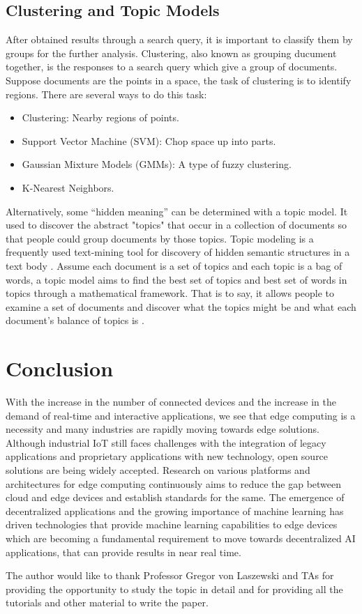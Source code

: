 \documentclass[sigconf]{acmart}
\begin{document}
\subsection{Clustering and Topic Models}
After obtained results through a search query, it is important to classify them by groups for the further analysis. Clustering, also known as grouping ducument together, is the responses to a search query which give a group of documents. Suppose documents are the points in a space, the task of clustering is to identify regions. There are several ways to do this task:
\begin{itemize}
\item Clustering: Nearby regions of points.
\item Support Vector Machine (SVM): Chop space up into parts.
\item Gaussian Mixture Models (GMMs): A type of fuzzy clustering.
\item K-Nearest Neighbors.
\end{itemize}

Alternatively, some “hidden meaning” can be determined with a topic model. It used to discover the abstract "topics" that occur in a collection of documents so that people could group documents by those topics. Topic modeling is a frequently used text-mining tool for discovery of hidden semantic structures in a text body \cite{editor11}. Assume each document is a set of topics and each topic is a bag of words, a topic model aims to find the best set of topics and best set of words in topics through a mathematical framework. That is to say, it allows people to examine a set of documents and discover what the topics might be and what each document's balance of topics is \cite{editor11}.

\section{Conclusion}
With the increase in the number of connected devices and the increase in the demand of real-time and interactive applications, we see that edge computing is a necessity and many industries are rapidly moving towards edge solutions. Although industrial IoT still faces challenges with the integration of legacy applications and proprietary applications with new technology, open source solutions are being widely accepted. Research on various platforms and architectures for edge computing continuously aims to reduce the gap between cloud and edge devices and establish standards for the same. The emergence of decentralized applications and the growing importance of machine learning has driven technologies that provide machine learning capabilities to edge devices which are becoming a fundamental requirement to move towards decentralized AI applications, that can provide results in near real time.

\begin{acks}
The author would like to thank Professor Gregor von Laszewski and TAs for providing the opportunity to study the topic in detail and for providing all the tutorials and other material to write the paper.

\end{acks}


 
\end{document}
